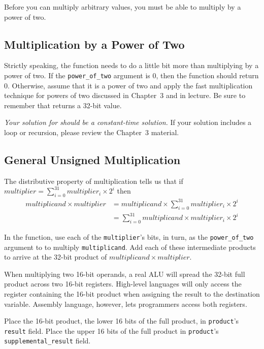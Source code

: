 Before you can multiply arbitrary values, you must be able to multiply by a power of two.

\subsection{Multiplication by a Power of Two}

Strictly speaking, the  function needs to do a little bit more than multiplying by a power of two.
If the \lstinline{power_of_two} argument is 0, then the function should return 0.
Otherwise, assume that it is a power of two and apply the fast multiplication technique for powers of two discussed in Chapter~3 and in lecture.
Be sure to remember that  returns a 32-bit value.

\textit{Your solution for  should be a constant-time solution.}
If your solution includes a loop or recursion, please review the Chapter~3 material.


\subsection{General Unsigned Multiplication}

The distributive property of multiplication tells us that if $multiplier = \sum_{i=0}^{31}multiplier_i \times 2^i$ then
\begin{align*}
    multiplicand \times multiplier  & = multiplicand \times \sum_{i=0}^{31}multiplier_i \times 2^i \\
                                    & = \sum_{i=0}^{31} multiplicand \times multiplier_i \times 2^i
\end{align*}

In the  function, use each of the \lstinline{multiplier}'s bits, in turn, as the \lstinline{power_of_two} argument to  to multiply \lstinline{multiplicand}.
Add each of these intermediate products to arrive at the 32-bit product of $multiplicand \times multiplier$.

When multiplying two 16-bit operands, a real ALU will spread the 32-bit full product across two 16-bit registers.
High-level languages will only access the register containing the 16-bit product when assigning the result to the destination variable.
Assembly language, however, lets programmers access both registers.

Place the 16-bit product, the lower 16 bits of the full product, in \lstinline{product}'s \lstinline{result} field.
Place the upper 16 bits of the full product in \lstinline{product}'s \lstinline{supplemental_result} field.


